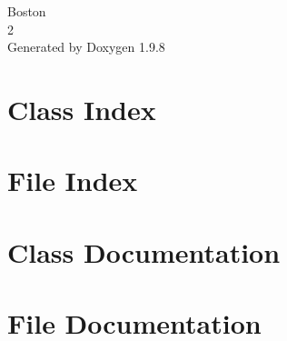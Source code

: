 \documentclass[twoside]{book}
\newcommand{\+}{\discretionary{\mbox{\scriptsize$\hookleftarrow$}}{}{}}
\newcommand{\clearemptydoublepage}{%
    \newpage{\pagestyle{empty}\cleardoublepage}%
  }
\begin{document}
  \raggedbottom
    \hypersetup{pageanchor=false,
                bookmarksnumbered=true,
                pdfencoding=unicode
               }
  \begin{titlepage}
  \vspace*{7cm}
  \begin{center}%
  {\Large Boston}\\
  [1ex]\large 2 \\
  \vspace*{1cm}
  {\large Generated by Doxygen 1.9.8}\\
  \end{center}
  \end{titlepage}
  \clearemptydoublepage
  \tableofcontents
  \clearemptydoublepage
  \hypersetup{pageanchor=true}
\chapter{Class Index}

\chapter{File Index}

\chapter{Class Documentation}




\chapter{File Documentation}






















  \backmatter
  \newpage
  \clearemptydoublepage
  \printindex
\end{document}
